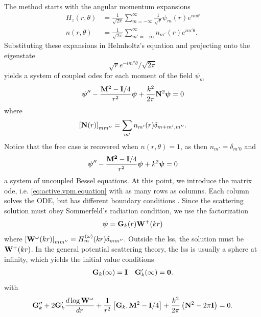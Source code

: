 The method starts with the angular momentum expansions
  \begin{subequations}
  \begin{align}
   H_z(r,\theta)	&= \frac{1}{\sqrt{2\pi}}\sum_{m=-\infty}^\infty \frac{1}{\sqrt{r}}\psi_m(r)e^{im\theta}	\\
   n(r,\theta)		&= \frac{1}{\sqrt{2\pi}}\sum_{m'=-\infty}^\infty n_{m'}(r)e^{im'\theta}.
  \end{align}
  \end{subequations}
Substituting these expansions in Helmholtz's equation and projecting
onto the eigenstate 
	\begin{equation*}
		\sqrt{r}e^{-im''\theta}/\sqrt{2\pi}
	\end{equation*} 
yields a system of coupled \glspl{ode} for each moment of the field $\psi_m$
	\begin{equation}
		\label{eq:active.vpm.equation}
		\boldsymbol{\psi}''-\frac{\mathbf{M}^2-\mathbf{I}/4}{r^2}\boldsymbol{\psi}+\frac{k^2}{2\pi}\mathbf{N}^2\boldsymbol{\psi}=0
	\end{equation}
where 
	\begin{equation*}
		\left[\mathbf{N}(r)\right]_{mm''}=\sum_{m'}n_{m'}(r)\delta_{m+m',m''}.
	\end{equation*}
Notice that the free case is recovered when $n(r,\theta)=1$, as 
then $n_{m'}=\delta_{m'0}$ and 
	\begin{equation}
		\boldsymbol{\psi}''-\frac{\mathbf{M^2}-\mathbf{I}/4}{r^2}\boldsymbol{\psi}+k^2\boldsymbol{\psi}=0
	\end{equation}
a system of uncoupled Bessel equations. At this point, we 
introduce the matrix \gls{ode}, i.e. \eqref{eq:active.vpm.equation} with as many 
rows as columns. Each column solves the ODE, but has different boundary conditions
\cite[\S15.2]{NEW1982}. Since the scattering solution must obey Sommerfeld's radiation
condition, we use the factorization
	\begin{equation}
		\boldsymbol{\psi} = \mathbf{G}_k(r)\mathbf{W}^{+}(kr)
	\end{equation}
where $\left[\mathbf{W}^{\omega}(kr)\right]_{mm''}=H_m^{(\omega)}(kr)\delta_{mm''}$.
Outside the \gls{lss}, the solution must be $\mathbf{W}^+(kr)$. In the general potential
scattering theory, the \gls{lss} is usually a sphere at infinity, which yields the 
initial value conditions
	\begin{align}
		\mathbf{G}_k(\infty)	&=\mathbf{I}	&	\mathbf{G}_k'(\infty)=\mathbf{0}.
	\end{align}
with 
	\begin{equation}
		\mathbf{G}_k''+2\mathbf{G}_k'\frac{d\log\mathbf{W}^\omega}{dr}+\frac{1}{r^2}\left[\mathbf{G}_k,\mathbf{M}^2-\mathbf{I}/4\right]
					+\frac{k^2}{2\pi}\left(\mathbf{N}^2-2\pi\mathbf{I}\right)=0.
	\end{equation}

